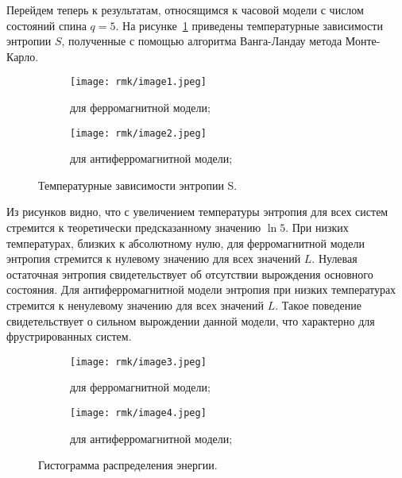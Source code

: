 %
%

Перейдем теперь к результатам, относящимся к часовой модели с числом состояний спина $q = 5$. На рисунке~\ref{fig:rmk-1} приведены температурные зависимости энтропии $S$, полученные с помощью алгоритма Ванга-Ландау метода Монте-Карло.

\begin{figure}[ht]
    \centering
    \begin{subfigure}{0.45\textwidth}
        \texttt{[image: rmk/image1.jpeg]}
        \caption{для ферромагнитной модели;}
    \end{subfigure}
    \begin{subfigure}{0.45\textwidth}
        \texttt{[image: rmk/image2.jpeg]}
        \caption{для антиферромагнитной модели;}
    \end{subfigure}
    \caption{Температурные зависимости энтропии S.}
    \label{fig:rmk-1}
\end{figure}

Из рисунков видно, что с увеличением температуры энтропия для всех систем стремится к теоретически предсказанному значению $\ln 5$. При низких температурах, близких к абсолютному нулю, для ферромагнитной модели энтропия стремится к нулевому значению для всех значений $L$. Нулевая остаточная энтропия свидетельствует об отсутствии вырождения основного состояния. Для антиферромагнитной модели энтропия при низких температурах стремится к ненулевому значению для всех значений $L$. Такое поведение свидетельствует о сильном вырождении данной модели, что характерно для фрустрированных систем.

\begin{figure}[ht]
    \centering
    \begin{subfigure}{0.45\textwidth}
        \texttt{[image: rmk/image3.jpeg]}
        \caption{для ферромагнитной модели;}
        \label{fig:rmk-2:a}
    \end{subfigure}
    \begin{subfigure}{0.45\textwidth}
        \texttt{[image: rmk/image4.jpeg]}
        \caption{для антиферромагнитной модели;}
        \label{fig:rmk-2:b}
    \end{subfigure}
    \caption{Гистограмма распределения энергии.}
    \label{fig:rmk-2}
\end{figure}

